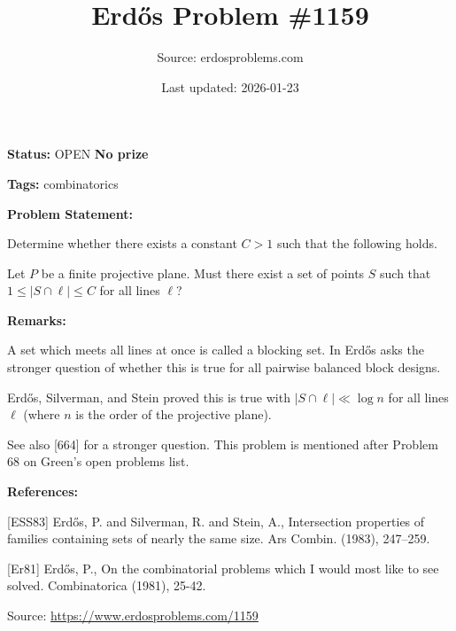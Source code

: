 \documentclass{article}
\title{Erd\H{o}s Problem \#1159}
\date{Last updated: 2026-01-23}
\author{Source: erdosproblems.com}
\begin{document}
\maketitle

\noindent\textbf{Status:} OPEN \quad \textbf{No prize}

\noindent\textbf{Tags:} combinatorics

\medskip
\noindent\textbf{Problem Statement:}

Determine whether there exists a constant $C>1$ such that the following holds.

Let $P$ be a finite projective plane. Must there exist a set of points $S$ such that $1\leq \lvert S\cap \ell\rvert \leq C$ for all lines $\ell$?

\bigskip
\noindent\textbf{Remarks:}

A set which meets all lines at once is called a blocking set. In \cite{Er81} Erd\H{o}s asks the stronger question of whether this is true for all pairwise balanced block designs.

Erd\H{o}s, Silverman, and Stein \cite{ESS83} proved this is true with $\lvert S\cap\ell \rvert\ll \log n$ for all lines $\ell$ (where $n$ is the order of the projective plane).

See also [664] for a stronger question. This problem is mentioned after Problem 68 on Green's open problems list.

\bigskip
\noindent\textbf{References:}

[ESS83] Erd\H{o}s, P. and Silverman, R. and Stein, A., Intersection properties of families containing sets of nearly
the same size. Ars Combin. (1983), 247--259.
 
 [Er81] Erd\H{o}s, P., On the combinatorial problems which I would most like to see solved. Combinatorica (1981), 25-42.

\bigskip
\noindent\small{Source: \url{https://www.erdosproblems.com/1159}}
\end{document}
